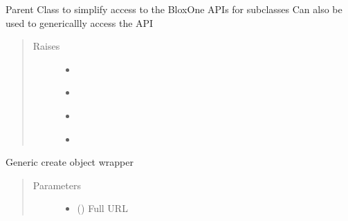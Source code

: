 \documentclass[letterpaper,10pt,english]{sphinxmanual}
\begin{document}
\begin{fulllineitems}
\label{\detokenize{code:bloxone.bloxone.b1}}
\sphinxAtStartPar
Parent Class to simplify access to the BloxOne APIs for subclasses
Can also be used to genericallly access the API
\begin{quote}\begin{description}
\item[{Raises}] \leavevmode\begin{itemize}
\item {} 
\sphinxAtStartPar
{\hyperref[\detokenize{code:bloxone.bloxone.IniFileSectionError}]{}} \textendash{} 

\item {} 
\sphinxAtStartPar
{\hyperref[\detokenize{code:bloxone.bloxone.IniFileKeyError}]{}} \textendash{} 

\item {} 
\sphinxAtStartPar
{\hyperref[\detokenize{code:bloxone.bloxone.APIKeyFormatError}]{}} \textendash{} 

\item {} 
\sphinxAtStartPar
{} \textendash{} 

\end{itemize}

\end{description}\end{quote}

\begin{fulllineitems}
\label{\detokenize{code:bloxone.bloxone.b1.create}}
\sphinxAtStartPar
Generic create object wrapper
\begin{quote}\begin{description}
\item[{Parameters}] \leavevmode\begin{itemize}
\item {} 
\sphinxAtStartPar
{} () \textendash{} Full URL


\end{itemize}
\end{description}
\end{quote}
\end{fulllineitems}
\end{fulllineitems}
\end{document}
